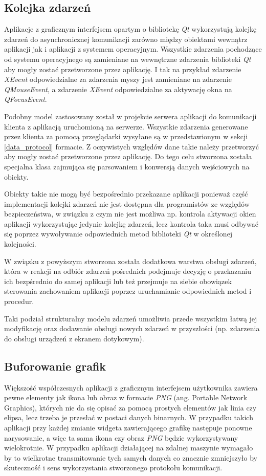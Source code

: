 \subsection{Kolejka zdarzeń}
Aplikacje z graficznym interfejsem opartym o bibliotekę \emph{Qt} wykorzystują kolejkę zdarzeń do asynchronicznej komunikacji zarówno między obiektami wewnątrz aplikacji jak i aplikacji z systemem operacyjnym. Wszystkie zdarzenia pochodzące od systemu operacyjnego są zamieniane na wewnętrzne zdarzenia biblioteki \emph{Qt} aby mogły zostać przetworzone przez aplikację. I tak na przykład zdarzenie \emph{XEvent} odpowiedzialne za zdarzenia myszy jest zamieniane na zdarzenie \emph{QMouseEvent}, a zdarzenie \emph{XEvent} odpowiedzialne za aktywację okna na \emph{QFocusEvent}. 

Podobny model zastosowany został w projekcie serwera aplikacji do komunikacji klienta z aplikacją uruchomioną na serwerze. Wszystkie zdarzenia generowane przez klienta za pomocą przeglądarki wysyłane są w przedstawionym w sekcji \ref{data_protocol} formacie. Z oczywistych względów dane takie należy przetworzyć aby mogły zostać przetworzone przez aplikację. Do tego celu stworzona została specjalna klasa zajmująca się parsowaniem i konwersją danych wejściowych na obiekty. 

Obiekty takie nie mogą być bezpośrednio przekazane aplikacji ponieważ część implementacji kolejki zdarzeń nie jest dostępna dla programistów ze względów bezpieczeństwa, w związku z czym nie jest możliwa np. kontrola aktywacji okien aplikacji wykorzystując jedynie kolejkę zdarzeń, lecz kontrola taka musi odbywać się poprzez wywoływanie odpowiednich metod biblioteki \emph{Qt} w określonej kolejności.

W związku z powyższym stworzona została dodatkowa warstwa obsługi zdarzeń, która w reakcji na odbiór zdarzeń pośrednich podejmuje decyzję o przekazaniu ich bezpśrednio do samej aplikacji lub też przejmuje na siebie obowiązek sterowania zachowaniem aplikacji poprzez uruchamianie odpowiednich metod i procedur. 

Taki podział strukturalny modelu zdarzeń umożliwia przede wszystkim łatwą jej modyfikację oraz dodawanie obsługi nowych zdarzeń w przyszłości (np. zdarzenia do obsługi urządzeń z ekranem dotykowym).

\subsection{Buforowanie grafik}
Większość współczesnych aplikacji z graficznym interfejsem użytkownika zawiera pewne elementy jak ikona lub obraz w formacie \emph{PNG} (ang. Portable Network Graphics), których nie da się opisać za pomocą prostych elementów jak linia czy elipsa, lecz trzeba je przesłać w postaci danych binarnych. W przypadku takich aplikacji przy każdej zmianie widgeta zawierającego grafikę następuje ponowne narysowanie, a więc ta sama ikona czy obraz \emph{PNG} będzie wykorzystywany wielokrotnie. W przypadku aplikacji działającej na zdalnej maszynie wymagało by to wielkrotne transmitowanie tych samych danych co znacznie zmniejszyło by skuteczność i sens wykorzystania stworzonego protokołu komunikacji.


